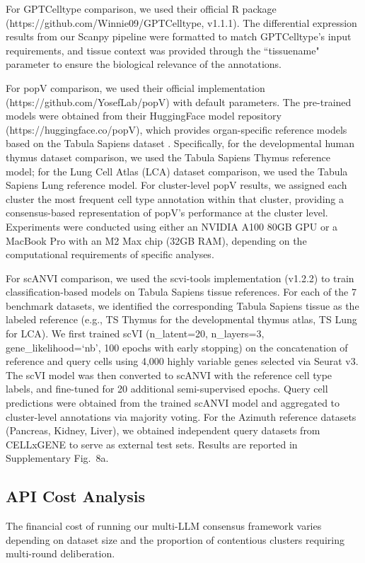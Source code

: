 \documentclass[pdflatex,sn-nature]{sn-jnl}%
\theoremstyle{thmstyleone}%
\theoremstyle{thmstyletwo}%
\theoremstyle{thmstylethree}%
\begin{document}
For GPTCelltype comparison, we used their official R package (https://github.com/Winnie09/GPTCelltype, v1.1.1). The differential expression results from our Scanpy pipeline were formatted to match GPTCelltype's input requirements, and tissue context was provided through the ``tissuename" parameter to ensure the biological relevance of the annotations.

For popV comparison, we used their official implementation (https://github.com/YosefLab/popV) with default parameters. The pre-trained models were obtained from their HuggingFace model repository (https://huggingface.co/popV), which provides organ-specific reference models based on the Tabula Sapiens dataset \cite{theTabulaSapiensConsortiumTabulaSapiensMultiple2022}. Specifically, for the developmental human thymus dataset comparison, we used the Tabula Sapiens Thymus reference model; for the Lung Cell Atlas (LCA) dataset comparison, we used the Tabula Sapiens Lung reference model. For cluster-level popV results, we assigned each cluster the most frequent cell type annotation within that cluster, providing a consensus-based representation of popV's performance at the cluster level. Experiments were conducted using either an NVIDIA A100 80GB GPU or a MacBook Pro with an M2 Max chip (32GB RAM), depending on the computational requirements of specific analyses.

For scANVI comparison, we used the scvi-tools implementation \cite{xu2021probabilistic} (v1.2.2) to train classification-based models on Tabula Sapiens tissue references. For each of the 7 benchmark datasets, we identified the corresponding Tabula Sapiens tissue as the labeled reference (e.g., TS Thymus for the developmental thymus atlas, TS Lung for LCA). We first trained scVI (n\_latent=20, n\_layers=3, gene\_likelihood=`nb', 100 epochs with early stopping) on the concatenation of reference and query cells using 4,000 highly variable genes selected via Seurat v3. The scVI model was then converted to scANVI with the reference cell type labels, and fine-tuned for 20 additional semi-supervised epochs. Query cell predictions were obtained from the trained scANVI model and aggregated to cluster-level annotations via majority voting. For the Azimuth reference datasets (Pancreas, Kidney, Liver), we obtained independent query datasets from CELLxGENE to serve as external test sets. Results are reported in Supplementary Fig.~8a.

\subsection{API Cost Analysis}
The financial cost of running our multi-LLM consensus framework varies depending on dataset size and the proportion of contentious clusters requiring multi-round deliberation.
\end{document}
